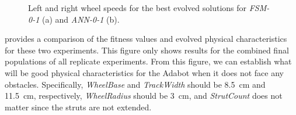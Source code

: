 \begin{figure}[!ht]
    \centering


    \vspace{-0.08in}


    \vspace{-0.08in}

    \caption{Left and right wheel speeds for the best evolved solutions for \emph{FSM-0-1} (a) and \emph{ANN-0-1} (b).}
    \label{fig:ANN-0-1-best-speed}

    \vspace{-0.1in}
\end{figure}


 provides a comparison of the fitness values and evolved physical characteristics for these two experiments.
%
This figure only shows results for the combined final populations of all replicate experiments.
%
From this figure, we can establish what will be good physical characteristics for the Adabot when it does not face any obstacles.
%
Specifically, \emph{WheelBase} and \emph{TrackWidth} should be 8.5~\si{cm} and 11.5~\si{cm}, respectively, \emph{WheelRadius} should be 3~\si{cm}, and \emph{StrutCount} does not matter since the struts are not extended.


